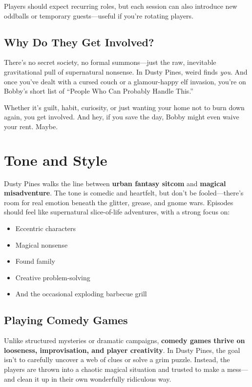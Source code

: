 Players should expect recurring roles, but each session can also introduce new oddballs or temporary guests---useful if you're rotating players.

\subsection{Why Do They Get Involved?}

There’s no secret society, no formal summons---just the raw, inevitable gravitational pull of supernatural nonsense. In Dusty Pines, weird finds \textit{you}. And once you’ve dealt with a cursed couch or a glamour-happy elf invasion, you’re on Bobby’s short list of “People Who Can Probably Handle This.”

Whether it’s guilt, habit, curiosity, or just wanting your home not to burn down again, you get involved. And hey, if you save the day, Bobby might even waive your rent. Maybe.

\section{Tone and Style}

Dusty Pines walks the line between \textbf{urban fantasy sitcom} and \textbf{magical misadventure}. The tone is comedic and heartfelt, but don’t be fooled---there's room for real emotion beneath the glitter, grease, and gnome wars. Episodes should feel like supernatural slice-of-life adventures, with a strong focus on:

\begin{itemize}
  \item Eccentric characters
  \item Magical nonsense
  \item Found family
  \item Creative problem-solving
  \item And the occasional exploding barbecue grill
\end{itemize}


\subsection{Playing Comedy Games}

Unlike structured mysteries or dramatic campaigns, \textbf{comedy games thrive on looseness, improvisation, and player creativity}. In Dusty Pines, the goal isn't to carefully uncover a web of clues or solve a grim puzzle. Instead, the players are thrown into a chaotic magical situation and trusted to make a mess---and clean it up in their own wonderfully ridiculous way.

